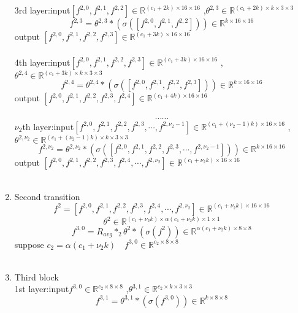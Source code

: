\begin{enumerate}
3rd layer:\quad input$[f^{2,0},f^{2,1},f^{2,2}] \in \mathbb{R}^{(c_1+2k)\times 16\times 16}$ ,$\theta^{2,3} \in \mathbb{R}^{(c_1+2k)\times k\times 3\times 3}$
$$ f^{2,3}=\theta^{2,3} \ast (\sigma([f^{2,0},f^{2,1},f^{2,2}]))\in \mathbb{R}^{k\times 16\times 16}$$
\quad\quad\quad\quad\quad output $[f^{2,0},f^{2,1}, f^{2,2},f^{2,3}] \in \mathbb{R}^{(c_1+3k)\times 16\times 16}$
\\ \hspace*{\fill} \\
4th layer:\quad input$[f^{2,0},f^{2,1},f^{2,2},f^{2,3}] \in \mathbb{R}^{(c_1+3k)\times 16\times 16}$ ,$\theta^{2,4} \in \mathbb{R}^{(c_1+3k)\times k\times3\times 3}$
$$ f^{2,4}=\theta^{2,4} \ast (\sigma([f^{2,0},f^{2,1},f^{2,2},f^{2,3}]))\in \mathbb{R}^{k\times 16\times 16}$$
\quad\quad\quad\quad\quad output $[f^{2,0},f^{2,1}, f^{2,2},f^{2,3},f^{2,4}] \in \mathbb{R}^{(c_1+4k)\times 16\times 16}$
\\ \hspace*{\fill} \\
$$\cdots\cdots$$
$\nu_2$th layer:\quad input$[f^{2,0},f^{2,1},f^{2,2},f^{2,3},\cdots,f^{2,\nu_2-1}] \in \mathbb{R}^{(c_1+(\nu_2-1)k)\times 16\times 16}$ ,$\theta^{2,\nu_2} \in \mathbb{R}^{(c_1+(\nu_2-1)k)\times k\times 3\times 3}$
$$ f^{2,\nu_2}=\theta^{2,\nu_2} \ast (\sigma([f^{2,0},f^{2,1},f^{2,2},f^{2,3},\cdots,f^{2,\nu_2-1}]))\in \mathbb{R}^{k\times 16\times 16}$$
\quad\quad\quad\quad\quad output $[f^{2,0},f^{2,1}, f^{2,2},f^{2,3},f^{2,4},\cdots,f^{2,\nu_2}] \in \mathbb{R}^{(c_1+\nu_2k)\times 16\times 16}$
\\ \hspace*{\fill} \\
\item Second transition
$$f^2 = [f^{2,0},f^{2,1}, f^{2,2},f^{2,3},f^{2,4},\cdots,f^{2,\nu_2}] \in \mathbb{R}^{(c_1+\nu_2k)\times 16\times 16}$$
$$\theta^2 \in \mathbb{R}^{(c_1+\nu_2k)\times \alpha(c_1+\nu_2k)\times 1\times 1}$$
$$f^{3,0}=R_{avg} \ast_2 \theta^{2} \ast (\sigma(f^2))\in \mathbb{R}^{\alpha(c_1+\nu_2k)\times 8\times 8}$$
suppose $c_2 = \alpha(c_1+\nu_2k)\quad f^{3,0}\in \mathbb{R}^{c_2\times 8\times 8}$
\\ \hspace*{\fill} \\
\item Third block\\
1st layer:\quad input$f^{3,0}\in \mathbb{R}^{c_2\times 8\times 8}$ ,$\theta^{3,1} \in \mathbb{R}^{ c_2\times k\times 3\times 3}$
$$f^{3,1}=\theta^{3,1} \ast (\sigma(f^{3,0}))\in \mathbb{R}^{k\times 8\times 8}$$

\end{enumerate}
